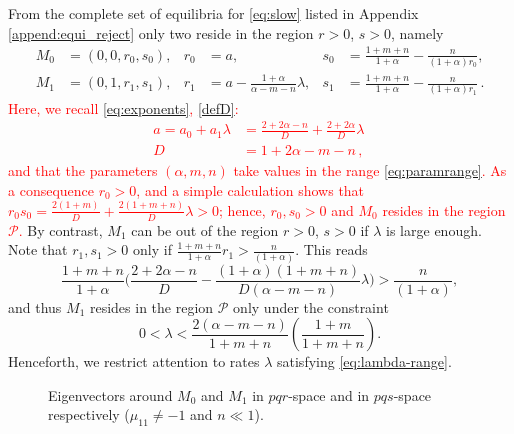 \documentclass[usletter,11pt]{article}
\newcommand{\tcr}{\textcolor{red}}
\theoremstyle{remark}
\begin{document}
From the complete set of equilibria for \eqref{eq:slow} listed in Appendix \ref{append:equi_reject} only two reside in 
the region $r > 0$, $s >0$, namely
\begin{align*}
 M_0 &= (0,0,r_0,s_0), & r_0 & =a , & s_0&=\frac{1+m+n}{1+\alpha} - \frac{n}{(1+\alpha)r_0},\\
 M_1 &= (0,1,r_1,s_1), & r_1 & = a -\frac{1+\alpha}{\alpha-m-n}\lambda, & s_1&=\frac{1+m+n}{1+\alpha} - \frac{n}{(1+\alpha)r_1} \, .
\end{align*}
\tcr{
Here, we recall \eqref{eq:exponents}, \eqref{defD}:
$$
\begin{aligned}
a = a_0 + a_1 \lambda &= \frac{2+2\alpha-n}{D} + \frac{2+2\alpha}{D}\lambda \, \\
D &= 1+2\alpha-m-n  \, ,
\end{aligned}
$$
and that the parameters $(\alpha, m, n)$ take values in the range \eqref{eq:paramrange}. As a consequence 
$r_0>0$, and a simple calculation shows that  $r_0s_0 = \frac{2(1+m)}{D} + \frac{2(1+m+n)}{D}\lambda>0$; hence,
$r_0, s_0>0$ and $M_0$  resides in the region $\mathcal{P}$. 
}
By contrast, $M_1$ can be out of the region $r>0$, $s>0$ if $\lambda$ is large enough. Note that $r_1,s_1>0$ only if $\frac{1+m+n}{1+\alpha}r_1 > \frac{n}{(1+\alpha)}$. This reads
$$\frac{1+m+n}{1+\alpha}\Big(\frac{2+2\alpha-n}{D} - \frac{(1+\alpha)(1+m+n)}{D(\alpha-m-n)}\lambda\Big) > \frac{n}{(1+\alpha)},$$
and thus $M_1$ resides in the region $\mathcal{P}$ only under the constraint
\begin{equation} \label{eq:lambda-range}
 0< \lambda < \frac{2(\alpha-m-n)}{1+m+n}\left(\frac{1+m}{1+m+n}\right).
\end{equation}
Henceforth, we restrict attention to rates $\lambda$ satisfying \eqref{eq:lambda-range}.

\begin{figure}
 \centering
  \subfigure[$pqr$-space]{
  \psfrag{r}{\scriptsize$r$}%
  \texttt{[image: equilibriapqr.eps]}\label{fig:eq1}
  }
  \quad \quad
  \subfigure[$pqs$-space]{
  \psfrag{r}{\scriptsize$s-\frac{1+m}{1+\alpha}$}%
  \texttt{[image: equilibriapqs.eps]}\label{fig:eq2}
  }
  \caption{Eigenvectors around $M_0$ and $M_1$ in $pqr$-space and in $pqs$-space respectively ($\mu_{11}\ne-1$ and $n\ll1$). } \label{fig:equilibria}
\end{figure}
\end{document}
